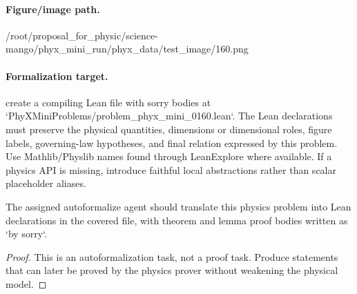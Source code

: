 \paragraph{Figure/image path.}
/root/proposal\_for\_physic/science-mango/phyx\_mini\_run/phyx\_data/test\_image/160.png

\paragraph{Formalization target.}
create a compiling Lean file with sorry bodies at `PhyXMiniProblems/problem\_phyx\_mini\_0160.lean`. The Lean declarations must preserve the physical quantities, dimensions or dimensional roles, figure labels, governing-law hypotheses, and final relation expressed by this problem.
Use Mathlib/Physlib names found through LeanExplore where available. If a physics API is missing, introduce faithful local abstractions rather than scalar placeholder aliases.

\begin{theorem}
\label{thm:physics:phyx_mini_0160:target}
The assigned autoformalize agent should translate this physics problem into Lean declarations in the covered file, with theorem and lemma proof bodies written as `by sorry`.
\end{theorem}
\begin{proof}
This is an autoformalization task, not a proof task. Produce statements that can later be proved by the physics prover without weakening the physical model.
\end{proof}

